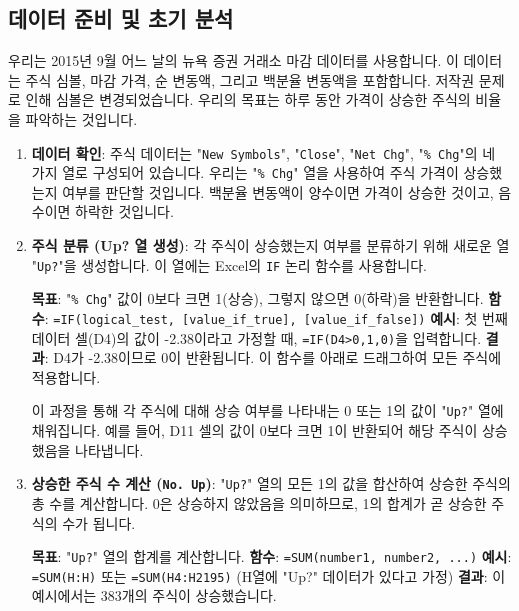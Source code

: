 \documentclass[11pt,a4paper]{book}
\newcommand{\excel}[1]{\texttt{#1}}
\theoremstyle{definition}
\begin{document}
\subsection{데이터 준비 및 초기 분석}
우리는 2015년 9월 어느 날의 뉴욕 증권 거래소 마감 데이터를 사용합니다. 이 데이터는 주식 심볼, 마감 가격, 순 변동액, 그리고 백분율 변동액을 포함합니다. 저작권 문제로 인해 심볼은 변경되었습니다. 우리의 목표는 하루 동안 가격이 상승한 주식의 비율을 파악하는 것입니다.

\begin{enumerate}
    \item \textbf{데이터 확인}:
    주식 데이터는 "\excel{New Symbols}", "\excel{Close}", "\excel{Net Chg}", "\excel{\% Chg}"의 네 가지 열로 구성되어 있습니다. 우리는 "\excel{\% Chg}" 열을 사용하여 주식 가격이 상승했는지 여부를 판단할 것입니다. 백분율 변동액이 양수이면 가격이 상승한 것이고, 음수이면 하락한 것입니다.

    \item \textbf{주식 분류 (Up? 열 생성)}:
    각 주식이 상승했는지 여부를 분류하기 위해 새로운 열 "\excel{Up?}"을 생성합니다. 이 열에는 Excel의 \excel{IF} 논리 함수를 사용합니다.
    \begin{examplebox}[title=Excel IF 함수 사용법]
        \textbf{목표}: "\excel{\% Chg}" 값이 0보다 크면 1(상승), 그렇지 않으면 0(하락)을 반환합니다.
        \textbf{함수}: \texttt{=IF(logical\_test, [value\_if\_true], [value\_if\_false])}
        \textbf{예시}: 첫 번째 데이터 셀(D4)의 값이 -2.38이라고 가정할 때, \texttt{=IF(D4>0,1,0)}을 입력합니다.
        \textbf{결과}: D4가 -2.38이므로 0이 반환됩니다. 이 함수를 아래로 드래그하여 모든 주식에 적용합니다.
    \end{examplebox}
    이 과정을 통해 각 주식에 대해 상승 여부를 나타내는 0 또는 1의 값이 "\excel{Up?}" 열에 채워집니다. 예를 들어, D11 셀의 값이 0보다 크면 1이 반환되어 해당 주식이 상승했음을 나타냅니다.

    \item \textbf{상승한 주식 수 계산 (\excel{No. Up})}:
    "\excel{Up?}" 열의 모든 1의 값을 합산하여 상승한 주식의 총 수를 계산합니다. 0은 상승하지 않았음을 의미하므로, 1의 합계가 곧 상승한 주식의 수가 됩니다.
    \begin{examplebox}[title=Excel SUM 함수 사용법]
        \textbf{목표}: "\excel{Up?}" 열의 합계를 계산합니다.
        \textbf{함수}: \texttt{=SUM(number1, number2, ...)}
        \textbf{예시}: \texttt{=SUM(H:H)} 또는 \texttt{=SUM(H4:H2195)} (H열에 "Up?" 데이터가 있다고 가정)
        \textbf{결과}: 이 예시에서는 383개의 주식이 상승했습니다.
    \end{examplebox}


\end{enumerate}
\end{document}
